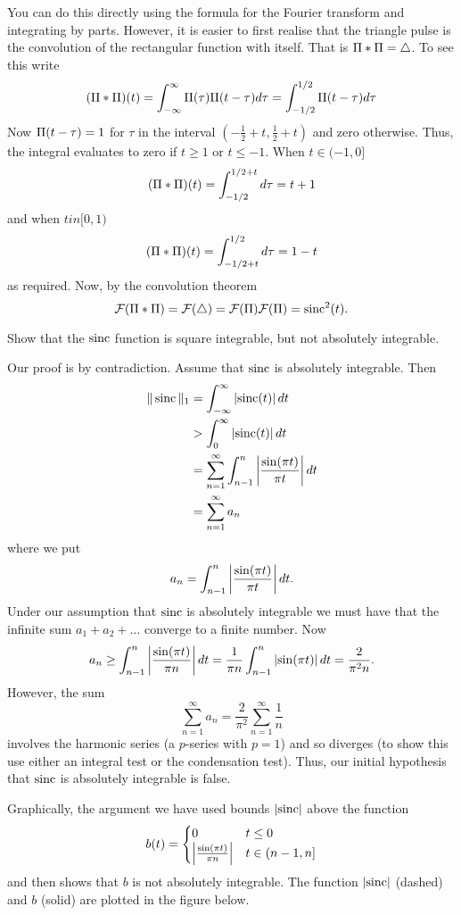 \begin{excersizelist}
\begin{solution}
You can do this directly using the formula for the Fourier transform and integrating by parts.  However, it is easier to first realise that the triangle pulse is the convolution of the rectangular function with itself.  That is $\Pi * \Pi = \bigtriangleup$.  To see this write
\[
(\Pi * \Pi)(t) = \int_{-\infty}^\infty \Pi(\tau)\Pi(t - \tau) d\tau = \int_{-1/2}^{1/2} \Pi(t - \tau) d\tau
\] 
Now $\Pi(t - \tau) = 1$ for $\tau$ in the interval $(-\tfrac{1}{2}+ t,\tfrac{1}{2} + t)$ and zero otherwise. 
Thus, the integral evaluates to zero if $t \geq 1$ or $t \leq -1$.  When $t \in (-1,0]$
\[
(\Pi * \Pi)(t) = \int_{-1/2}^{1/2+t} d\tau = t + 1
\]
and when $t in [0,1)$
\[
(\Pi * \Pi)(t) = \int_{-1/2+t}^{1/2} d\tau = 1 - t
\]
as required.  Now, by the convolution theorem~
\[
{\mathcal F}(\Pi * \Pi) = {\mathcal F}(\bigtriangleup) = {\mathcal F}(\Pi) {\mathcal F}(\Pi) = \operatorname{sinc}^2(t).
\]
\end{solution}

\item \label{exer:sincnotabsint}  Show that the $\operatorname{sinc}$ function is square integrable, but not absolutely integrable.
\begin{solution}
Our proof is by contradiction.  Assume that $\operatorname{sinc}$ is absolutely integrable.  Then
\begin{align*}
\|\operatorname{sinc}\|_1 &= \int_{-\infty}^\infty \left\vert \operatorname{sinc}(t) \right\vert dt \\
&> \int_{0}^\infty \left\vert \operatorname{sinc}(t) \right\vert dt \\
&= \sum_{n=1}^\infty \int_{n-1}^{n} \left\vert \frac{\sin(\pi t)}{\pi t} \right\vert dt \\
&= \sum_{n=1}^\infty a_n
\end{align*}
where we put
\[
a_n = \int_{n-1}^{n} \left\vert \frac{\sin(\pi t)}{\pi t} \right\vert dt.
\] 
Under our assumption that $\operatorname{sinc}$ is absolutely integrable we must have that the infinite sum $a_1 + a_2 + \dots$ converge to a finite number.  Now
\[
a_n \geq  \int_{n-1}^{n} \left\vert \frac{\sin(\pi t)}{\pi n} \right\vert dt = \frac{1}{\pi n} \int_{n-1}^{n} \left\vert \sin(\pi t) \right\vert dt = \frac{2}{\pi^2 n}.
\]
However, the sum 
\[
\sum_{n=1}^\infty a_n = \frac{2}{\pi^2} \sum_{n=1}^\infty \frac{1}{n}
\]
involves the harmonic series (a $p$-series with $p=1$) and so diverges (to show this use either an integral test or the condensation test).  Thus, our initial hypothesis that $\operatorname{sinc}$ is absolutely integrable is false.

Graphically, the argument we have used bounds $\left\vert \operatorname{sinc} \right\vert$ above the function
\[
b(t) =  \begin{cases}
0 & t \leq 0 \\
\left\vert \frac{\sin(\pi t)}{\pi n} \right\vert & t \in (n-1, n] 
\end{cases}
\]
and then shows that $b$ is not absolutely integrable.  The function $\left\vert \operatorname{sinc} \right\vert$ (dashed) and $b$ (solid) are plotted in the figure below.


\end{solution}
\end{excersizelist}
